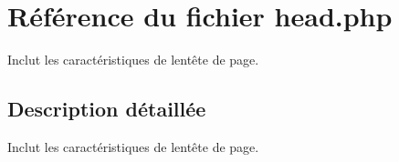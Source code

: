 \hypertarget{head_8php}{}\section{Référence du fichier head.\+php}
\label{head_8php}


Inclut les caractéristiques de l\textquotesingle{}entête de page.  




\subsection{Description détaillée}
Inclut les caractéristiques de l\textquotesingle{}entête de page. 

